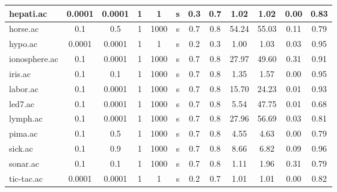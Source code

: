 \begin{table}[htbp]
\begin{tabular}{|l|c|c|c|c|c|c|c||c|c|c|c|}
		\hline
		hepati.ac      & 0.0001   & 0.0001      & 1              & 1                   & s        & 0.3    & 0.7   & 1.02           & 1.02           & 0.00           & 0.83           \\
		\hline
		horse.ac       & 0.1      & 0.5         & 1              & 1000                & s        & 0.7    & 0.8   & 54.24          & 55.03          & 0.11           & 0.79           \\
		\hline
		hypo.ac        & 0.0001   & 0.0001      & 1              & 1                   & s        & 0.2    & 0.3   & 1.00           & 1.03           & 0.03           & 0.95           \\
		\hline
		ionosphere.ac  & 0.1      & 0.0001      & 1              & 1000                & s        & 0.7    & 0.8   & 27.97          & 49.60          & 0.31           & 0.91           \\
		\hline
		iris.ac        & 0.1      & 0.1         & 1              & 1000                & s        & 0.7    & 0.8   & 1.35           & 1.57           & 0.00           & 0.95           \\
		\hline
		labor.ac       & 0.1      & 0.0001      & 1              & 1000                & s        & 0.7    & 0.8   & 15.70          & 24.23          & 0.01           & 0.93           \\
		\hline
		led7.ac        & 0.1      & 0.0001      & 1              & 1000                & s        & 0.7    & 0.8   & 5.54           & 47.75          & 0.01           & 0.68           \\
		\hline
		lymph.ac       & 0.1      & 0.0001      & 1              & 1000                & s        & 0.7    & 0.8   & 27.96          & 56.69          & 0.03           & 0.81           \\
		\hline
		pima.ac        & 0.1      & 0.5         & 1              & 1000                & s        & 0.7    & 0.8   & 4.55           & 4.63           & 0.00           & 0.79           \\
		\hline
		sick.ac        & 0.1      & 0.9         & 1              & 1000                & s        & 0.7    & 0.8   & 8.66           & 6.82           & 0.09           & 0.96           \\
		\hline
		sonar.ac       & 0.1      & 0.1         & 1              & 1000                & s        & 0.7    & 0.8   & 1.11           & 1.96           & 0.31           & 0.79           \\
		\hline
		tic-tac.ac     & 0.0001   & 0.0001      & 1              & 1                   & s        & 0.2    & 0.7   & 1.01           & 1.01           & 0.00           & 0.82           \\

\end{tabular}
\end{table}
